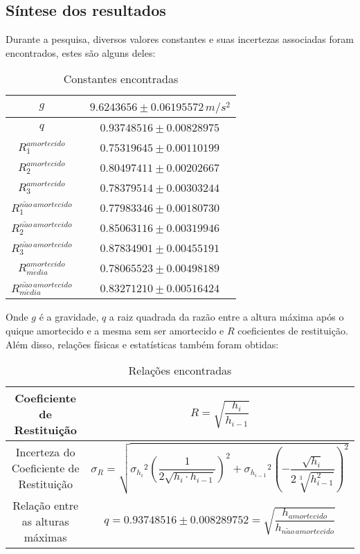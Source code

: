 \documentclass[a4paper, 12pt]{article}
\begin{document}
		\subsection{Síntese dos resultados}
		Durante a pesquisa, diversos valores constantes e suas incertezas associadas foram encontrados, estes são alguns deles:		
		\begin{table}[H]
			\centering
			\begin{tabular}{c|c}
				\hline $g$ & \ $9.6243656 \pm 0.06195572 \, m/s^2$ \\
				\hline $q$ & \ $0.93748516 \pm 0.00828975$\\
				\hline $R_{1}^{amortecido}$ & \ $0.75319645 \pm 0.00110199$\\
				\hline $R_{2}^{amortecido}$ & \ $0.80497411 \pm 0.00202667$\\
				\hline $R_{3}^{amortecido}$ & \ $0.78379514 \pm 0.00303244$\\
				\hline $R_{1}^{n\tilde{a}o \, amortecido}$ & \ $0.77983346 \pm 0.00180730$\\
				\hline $R_{2}^{n\tilde{a}o \, amortecido}$ & \ $0.85063116 \pm 0.00319946$\\
				\hline $R_{3}^{n\tilde{a}o \, amortecido}$ & \ $0.87834901 \pm 0.00455191$\\
				\hline $R_{m\acute{e}dia}^{amortecido}$ & \ $0.78065523 \pm 0.00498189$\\
				\hline $R_{m\acute{e}dia}^{n\tilde{a}o \, amortecido}$ & \ $0.83271210 \pm 0.00516424$\\
				\hline
			\end{tabular}	
			\caption{Constantes encontradas}
			\label{tcm}		
		\end{table}
		\noindent Onde $g$ é a gravidade, $q$ a raiz quadrada da razão entre a altura máxima após o quique amortecido e a mesma sem ser amortecido e $R$ coeficientes de restituição. \\
		Além disso, relações físicas e estatísticas também foram obtidas:
		\begin{table}[H]
			\centering			
			\begin{tabular}{c|c}
  			\hline
  			Coeficiente de Restituição & $R= \sqrt{\dfrac{h_i}{h_{i-1}}}$\\
  			\hline Incerteza do Coeficiente de Restituição & $\sigma_R = \sqrt{{\sigma_{h_i}}^2{\left( \dfrac{1}{2\sqrt{h_i \cdot h_{i-1}}} \right) }^2+{{\sigma_{h_{i-1}}}^2{\left( -\dfrac{\sqrt{h_i}}{2\sqrt[3]{h_{i-1}^2}} \right) }^2}}$\\
  			\hline Relação entre as alturas máximas & $q = 0.93748516 \pm 0.008289752 = \sqrt{\dfrac{h_{amortecido}}{h_{n\tilde{a}o \, amortecido}}}$\\
  			\hline
			\end{tabular}
			\caption{Relações encontradas}
			\label{tcm}		
		\end{table}
\end{document}
